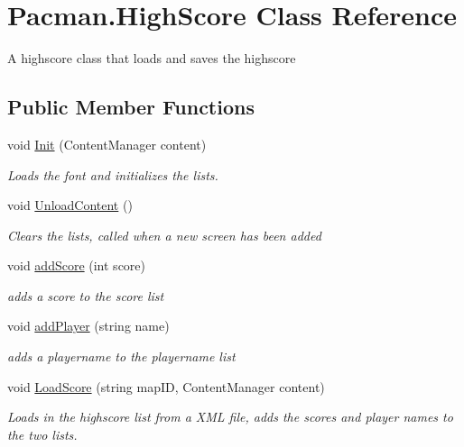 \hypertarget{class_pacman_1_1_high_score}{\section{Pacman.\-High\-Score Class Reference}
\label{class_pacman_1_1_high_score}
}


A highscore class that loads and saves the highscore  


\subsection*{Public Member Functions}
\begin{DoxyCompactItemize}
\item 
void \hyperlink{class_pacman_1_1_high_score_a68a80a79321c05de0e9dbd444afed288}{Init} (Content\-Manager content)
\begin{DoxyCompactList}\small\item\em Loads the font and initializes the lists. \end{DoxyCompactList}\item 
void \hyperlink{class_pacman_1_1_high_score_a9151601a735d2494e9bcd297950e19fc}{Unload\-Content} ()
\begin{DoxyCompactList}\small\item\em Clears the lists, called when a new screen has been added \end{DoxyCompactList}\item 
void \hyperlink{class_pacman_1_1_high_score_aa5e6b11999cbdc295e51a0f86bb9242f}{add\-Score} (int score)
\begin{DoxyCompactList}\small\item\em adds a score to the score list \end{DoxyCompactList}\item 
void \hyperlink{class_pacman_1_1_high_score_acac831b7a03643163018119010051ca4}{add\-Player} (string name)
\begin{DoxyCompactList}\small\item\em adds a playername to the playername list \end{DoxyCompactList}\item 
void \hyperlink{class_pacman_1_1_high_score_a145a1e9c272af287fef1a67a618ce2ca}{Load\-Score} (string map\-I\-D, Content\-Manager content)
\begin{DoxyCompactList}\small\item\em Loads in the highscore list from a X\-M\-L file, adds the scores and player names to the two lists. \end{DoxyCompactList}\item 

\end{DoxyCompactItemize}
